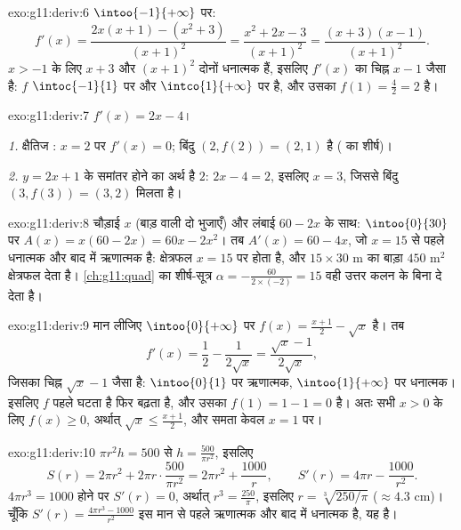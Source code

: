 \begin{solution}{exo:g11:deriv:6}
$\intoo{-1}{+\infty}$ पर:
\[
f'(x) = \frac{2x(x+1) - (x^2+3)}{(x+1)^2}
= \frac{x^2 + 2x - 3}{(x+1)^2}
= \frac{(x+3)(x-1)}{(x+1)^2}.
\]
$x > -1$ के लिए $x + 3$ और $(x+1)^2$ दोनों धनात्मक हैं, इसलिए $f'(x)$ का चिह्न $x - 1$ जैसा
है: $f$ $\intoc{-1}{1}$ पर  और $\intco{1}{+\infty}$ पर  है, और उसका  $f(1) = \frac{4}{2} = 2$ है।
\end{solution}

\begin{solution}{exo:g11:deriv:7}
$f'(x) = 2x - 4$।

\emph{1.} क्षैतिज : $x = 2$ पर $f'(x) = 0$; बिंदु $(2, f(2)) = (2, 1)$ है ( का शीर्ष)।

\emph{2.} $y = 2x + 1$ के समांतर होने का अर्थ है  $2$: $2x - 4 = 2$, इसलिए $x = 3$,
जिससे बिंदु $(3, f(3)) = (3, 2)$ मिलता है।
\end{solution}

\begin{solution}{exo:g11:deriv:8}
चौड़ाई $x$ (बाड़ वाली दो भुजाएँ) और लंबाई $60 - 2x$ के साथ: $\intoo{0}{30}$ पर $A(x) = x(60 - 2x) = 60x - 2x^2$। तब
$A'(x) = 60 - 4x$, जो $x = 15$ से पहले धनात्मक और बाद में ऋणात्मक है: क्षेत्रफल $x = 15$ पर
 होता है, और $15 \times 30$ m का बाड़ा $450$ m$^2$ क्षेत्रफल देता है। \cref{ch:g11:quad} का
शीर्ष-सूत्र $\alpha = -\frac{60}{2 \times (-2)} = 15$ वही उत्तर कलन के बिना दे देता है।
\end{solution}

\begin{solution}{exo:g11:deriv:9}
मान लीजिए $\intoo{0}{+\infty}$ पर $f(x) = \frac{x+1}{2} - \sqrt x$ है। तब
\[
f'(x) = \frac12 - \frac{1}{2\sqrt x} = \frac{\sqrt x - 1}{2\sqrt x},
\]
जिसका चिह्न $\sqrt x - 1$ जैसा है: $\intoo{0}{1}$ पर ऋणात्मक, $\intoo{1}{+\infty}$ पर धनात्मक। इसलिए $f$ पहले
घटता है फिर बढ़ता है, और उसका  $f(1) = 1 - 1 = 0$ है। अतः सभी $x > 0$ के लिए $f(x) \geq 0$,
अर्थात् $\sqrt x \leq \frac{x+1}{2}$, और समता केवल $x = 1$ पर।
\end{solution}

\begin{solution}{exo:g11:deriv:10}
$\pi r^2 h = 500$ से $h = \frac{500}{\pi r^2}$, इसलिए
\[
S(r) = 2\pi r^2 + 2\pi r \cdot \frac{500}{\pi r^2}
= 2\pi r^2 + \frac{1000}{r},
\qquad
S'(r) = 4\pi r - \frac{1000}{r^2}.
\]
$4\pi r^3 = 1000$ होने पर $S'(r) = 0$, अर्थात् $r^3 = \frac{250}{\pi}$, इसलिए $r = \sqrt[3]{250/\pi}$ ($\approx 4.3$ cm)। चूँकि $S'(r) =
\frac{4\pi r^3 - 1000}{r^2}$ इस
मान से पहले ऋणात्मक और बाद में धनात्मक है, यह  है।
\end{solution}

